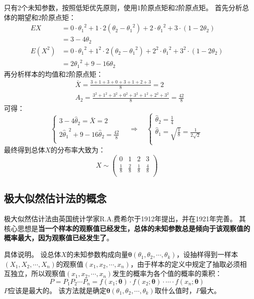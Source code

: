 只有2个未知参数，按照低矩优先原则，使用1阶原点矩和2阶原点矩。
首先分析总体的期望和2阶原点矩：
\begin{align*}
EX&=0\cdot {\theta _1}^2+1\cdot 2\left( \theta _2-{\theta _1}^2 \right) +2\cdot {\theta _1}^2+3\cdot \left( 1-2\theta _2 \right) \\
&=3-4\theta _2 \\
E\left( X^2 \right) &=0\cdot {\theta _1}^2+1^2\cdot 2\left( \theta _2-{\theta _1}^2 \right) +2^2\cdot {\theta _1}^2+3^2\cdot \left( 1-2\theta _2 \right) \\
&=2{\theta _1}^2+9-16\theta _2
\end{align*}
再分析样本的均值和2阶原点矩：
\begin{align*}
&\bar{X}=\frac{3+1+3+0+3+1+2+3}{8}=2 \\
&A_2=\frac{3^2+1^2+3^2+0^2+3^2+1^2+2^2+3^2}{8}=\frac{42}{8}
\end{align*}
可得：
\[
\begin{cases}
	3-4\hat{\theta}_2=\bar{X}=2\\
	2{\hat{\theta}_1}^2+9-16\hat{\theta}_2=\frac{42}{8}\\
\end{cases}\quad \Rightarrow \quad \begin{cases}
	\hat{\theta}_2=\frac{1}{4}\\
	\hat{\theta}_1=\sqrt{\frac{1}{8}}=\frac{1}{2\sqrt{2}}\\
\end{cases}
\]
最终得到总体$X$的分布率大致为：
\[
X\sim \left( \begin{matrix}
    0&		1&		2&		3\\
    \frac{1}{8}&		\frac{2}{8}&		\frac{1}{8}&		\frac{4}{8}\\
\end{matrix} \right)
\]

\subsection{极大似然估计法的概念}

极大似然估计法由英国统计学家R.A.费希尔于1912年提出，并在1921年完善。
其核心思想是{\bf 当一个样本的观察值已经发生，总体的未知参数总是倾向于该观察值的概率最大，因为观察值已经发生了}。

具体说明。
设总体$X$的未知参数构成向量$\boldsymbol{\theta }\left( \theta _1,\theta _2,\cdots ,\theta _k \right) $，设抽样得到一样本$\left( X_1,X_2,\cdots ,X_n \right) $的观察值$\left( x_1,x_2,\cdots ,x_n \right) $，由于样本的定义中规定了抽取必须相互独立，所以观察值$\left( x_1,x_2,\cdots ,x_n \right) $发生的概率为各个值的概率的乘积：
\[
P=P_1P_2\cdots P_n=f\left( x_1;\boldsymbol{\theta } \right) \cdot f\left( x_2;\boldsymbol{\theta } \right) \cdot \cdots \cdot f\left( x_n;\boldsymbol{\theta } \right)
\]
$P$应该是最大的。
该方法就是确定$\boldsymbol{\theta }\left( \theta _1,\theta _2,\cdots ,\theta _k \right) $取什么值时，$P$最大。

